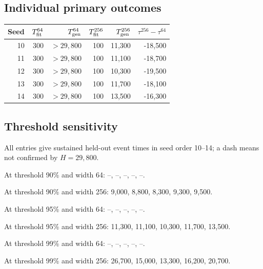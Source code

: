 \subsection{Individual primary outcomes}

\begin{center}

\begin{tabular}{rrrrrr}

\toprule

Seed & $T_{\rm fit}^{64}$ & $T_{\rm gen}^{64}$ & $T_{\rm fit}^{256}$ & $T_{\rm gen}^{256}$ & $\tau^{256}-\tau^{64}$ \\

\midrule

10 & 300 & $>29{,}800$ & 100 & 11,300 & -18,500 \\

11 & 300 & $>29{,}800$ & 100 & 11,100 & -18,700 \\

12 & 300 & $>29{,}800$ & 100 & 10,300 & -19,500 \\

13 & 300 & $>29{,}800$ & 100 & 11,700 & -18,100 \\

14 & 300 & $>29{,}800$ & 100 & 13,500 & -16,300 \\

\bottomrule

\end{tabular}

\end{center}

\subsection{Threshold sensitivity}

All entries give sustained held-out event times in seed order 10--14; a dash means not confirmed by $H=29{,}800$.

At threshold 90\% and width 64: --, --, --, --, --.

At threshold 90\% and width 256: 9,000, 8,800, 8,300, 9,300, 9,500.

At threshold 95\% and width 64: --, --, --, --, --.

At threshold 95\% and width 256: 11,300, 11,100, 10,300, 11,700, 13,500.

At threshold 99\% and width 64: --, --, --, --, --.

At threshold 99\% and width 256: 26,700, 15,000, 13,300, 16,200, 20,700.

